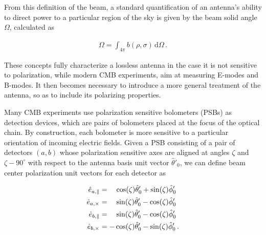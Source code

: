 \documentclass[a4paper,11pt]{article}
\newcommand{\co}{\mathbin{\|}}
\newcommand{\cx}{\mathbin{\times}}
\begin{document}
\noindent
From this definition of the beam, a standard quantification of an antenna's ability to direct power to a particular region of the sky is given by the beam solid angle $\Omega$, calculated as

\begin{equation}
\begin{aligned}
\Omega = \int_{4\pi} \mathit{b}(\rho,\sigma) \, \mathrm{d} \Omega \, .
\end{aligned}
\label{eq::omega_def}
\end{equation}

\noindent
These concepts fully characterize a lossless antenna in the case it is not sensitive to polarization, while modern CMB experiments, aim at measuring E-modes and B-modes. It then becomes necessary to introduce a more general treatment of the antenna, so as to include its polarizing properties. 


Many CMB experiments use polarization sensitive bolometers (PSBs) as detection devices, which are pairs of bolometers placed at the focus of the optical chain. By construction, each bolometer is more sensitive to a particular orientation of incoming electric fields. Given a PSB consisting of a pair of detectors $(a,b)$ whose polarization sensitive axes are aligned at angles $\zeta$ and $\zeta - 90^{\circ}$ with respect to the antenna basis unit vector $\hat{\theta}'_0$, we can define beam center polarization unit vectors for each detector as

\begin{align}
\hat{e}_{a,{\co}}    &= \quad \cos(\zeta)\hat{\theta}'_0 + \sin(\zeta)\hat{\phi}'_0 \\
\hat{e}_{a,{\cx}}    &= \quad \sin(\zeta)\hat{\theta}'_0 - \cos(\zeta)\hat{\phi}'_0 \\
\hat{e}_{b,{\co}}    &= \quad \sin(\zeta)\hat{\theta}'_0 - \cos(\zeta)\hat{\phi}'_0 \\
\hat{e}_{b,{\cx}}    &= -\cos(\zeta)\hat{\theta}'_0 - \sin(\zeta)\hat{\phi}'_0 \, \rm{.} 
\label{eq::copol_bolo}
\end{align}


\end{document}
